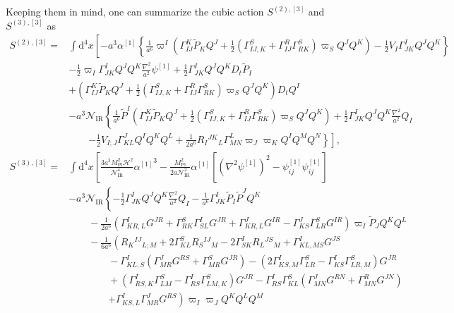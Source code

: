 \documentclass[aps, prd
, preprint
, nofootinbib 
, longbibliography
]{revtex4-1}
\newcommand{\dd}{\mathrm{d}}
\newcommand{\Mpl}{M_\mathrm{Pl}}
\newcommand{\IR}{\mathrm{IR}}
\newcommand{\calH}{\mathcal{H}}
\newcommand{\calN}{\mathcal{N}}
\newcommand{\bae}[1]{\begin{align} #1 \end{align}}
\begin{document}
Keeping them in mind, one can summarize the cubic action $S^{(2),[3]}$ and $S^{(3),[3]}$ as
\bae{
    S^{(2),[3]}=&\int\dd^4x\left[-a^3\alpha^{[1]}\left\{\frac{1}{a^6}\varpi^I\left(\Gamma^K_{IJ}\tilde{P}_KQ^J+\frac{1}{2}(\Gamma^S_{IJ,K}+\Gamma^R_{IJ}\Gamma^S_{RK})\varpi_SQ^JQ^K\right)-\frac{1}{2}V_I\Gamma^I_{JK}Q^JQ^K\right\} \right. \nonumber \\
    &-\frac{1}{2}\varpi_I\Gamma^I_{JK}Q^JQ^K\frac{\nabla^2}{a^2}\psi^{[1]}
    +\frac{1}{2}\Gamma^I_{JK}Q^JQ^KD_t\tilde{P}_I \nonumber \\
    &+\left(\Gamma^K_{IJ}\tilde{P}_KQ^J+\frac{1}{2}(\Gamma^S_{IJ,K}+\Gamma^R_{IJ}\Gamma^S_{RK})\varpi_SQ^JQ^K\right)D_tQ^I \nonumber \\
    &-a^3\calN_\IR\left\{\frac{1}{a^6}\tilde{P}^I\left(\Gamma^K_{IJ}\tilde{P}_KQ^J+\frac{1}{2}(\Gamma^S_{IJ,K}+\Gamma^R_{IJ}\Gamma^S_{RK})\varpi_SQ^JQ^K\right)+\frac{1}{2}\Gamma^I_{JK}Q^JQ^K\frac{\nabla^2}{a^2}Q_I \right. \nonumber \\
    &\qquad\left.\left.-\frac{1}{2}V_{I;J}\Gamma^J_{KL}Q^IQ^KQ^L+\frac{1}{2a^6}R_I{}^{JK}{}_L\Gamma^L_{MN}\varpi_J\varpi_KQ^IQ^MQ^N\right\}\right], \\
    S^{(3),[3]}=&\int\dd^4x\left[\frac{3a^3\Mpl^2\calH^2}{\calN_\IR^4}{\alpha^{[1]}}^3-\frac{\Mpl^2}{2a\calN_\IR^2}\alpha^{[1]}[(\nabla^2\psi^{[1]})^2-\psi^{[1]}_{ij}\psi^{[1]}_{ij}] \right. \nonumber \\
	&-a^3\calN_\IR\left\{-\frac{1}{2}\Gamma^I_{JK}Q^JQ^K\frac{\nabla^2}{a^2}Q_I-\frac{1}{a^6}\Gamma^I_{JK}\tilde{P}_I\tilde{P}^JQ^K \right. \nonumber \\
    &\qquad
    -\frac{1}{2a^6}\left(\Gamma^I_{KR,L}G^{JR}+\Gamma^S_{RK}\Gamma^I_{SL}G^{JR}+\Gamma^J_{KR,L}G^{IR}-\Gamma^J_{KS}\Gamma^S_{LR}G^{IR}\right)\varpi_I\tilde{P}_JQ^KQ^L \nonumber \\
    &\qquad-\frac{1}{6a^6}\left(R_K{}^{IJ}{}_{L;M}+2\Gamma^S_{KL}R_S{}^{IJ}{}_M-2\Gamma^I_{SK}R_L{}^{JS}{}_M+\Gamma^I_{KL,MS}G^{JS} \right. \nonumber \\
    &\qquad\qquad-\Gamma^I_{KL,S}(\Gamma^J_{MR}G^{RS}+\Gamma^S_{MR}G^{JR})
    -(2\Gamma^I_{KS,M}\Gamma^S_{LR}-\Gamma^I_{KS}\Gamma^S_{LR,M})G^{JR} \nonumber \\
    &\qquad\qquad
    +(\Gamma^I_{RS,K}\Gamma^S_{LM}-\Gamma^I_{RS}\Gamma^S_{LM,K})G^{JR}-\Gamma^I_{RS}\Gamma^S_{KL}(\Gamma^J_{MN}G^{RN}+\Gamma^R_{MN}G^{JN}) \nonumber \\
    &\qquad\qquad
    \left.+\Gamma^I_{KS,L}\Gamma^J_{MR}G^{RS}\right)\varpi_I\varpi_JQ^KQ^LQ^M \nonumber \\
}
\end{document}
